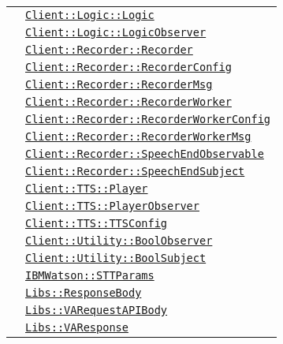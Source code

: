 \begin{longtable}{|>{\centering}m{3cm}|m{10cm}<{\centering}|}
& \hyperref[Client::Logic::Logic]{\texttt{Client::Logic::Logic}}\\
& \hyperref[Client::Logic::LogicObserver]{\texttt{Client::Logic::LogicObserver}}\\
& \hyperref[Client::Recorder::Recorder]{\texttt{Client::Recorder::Recorder}}\\
& \hyperref[Client::Recorder::RecorderConfig]{\texttt{Client::Recorder::RecorderConfig}}\\
& \hyperref[Client::Recorder::RecorderMsg]{\texttt{Client::Recorder::RecorderMsg}}\\
& \hyperref[Client::Recorder::RecorderWorker]{\texttt{Client::Recorder::RecorderWorker}}\\
& \hyperref[Client::Recorder::RecorderWorkerConfig]{\texttt{Client::Recorder::RecorderWorkerConfig}}\\
& \hyperref[Client::Recorder::RecorderWorkerMsg]{\texttt{Client::Recorder::RecorderWorkerMsg}}\\
& \hyperref[Client::Recorder::SpeechEndObservable]{\texttt{Client::Recorder::SpeechEndObservable}}\\
& \hyperref[Client::Recorder::SpeechEndSubject]{\texttt{Client::Recorder::SpeechEndSubject}}\\
& \hyperref[Client::TTS::Player]{\texttt{Client::TTS::Player}}\\
& \hyperref[Client::TTS::PlayerObserver]{\texttt{Client::TTS::PlayerObserver}}\\
& \hyperref[Client::TTS::TTSConfig]{\texttt{Client::TTS::TTSConfig}}\\
& \hyperref[Client::Utility::BoolObserver]{\texttt{Client::Utility::BoolObserver}}\\
& \hyperref[Client::Utility::BoolSubject]{\texttt{Client::Utility::BoolSubject}}\\
& \hyperref[IBMWatson::STTParams]{\texttt{IBMWatson::STTParams}}\\
& \hyperref[Libs::ResponseBody]{\texttt{Libs::ResponseBody}}\\
& \hyperref[Libs::VARequestAPIBody]{\texttt{Libs::VARequestAPIBody}}\\
& \hyperref[Libs::VAResponse]{\texttt{Libs::VAResponse}}\\ \hline


\end{longtable}
